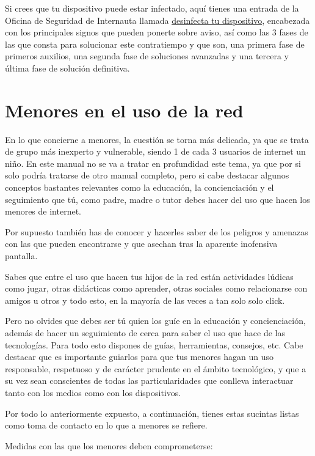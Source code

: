 \documentclass[
  a4paper,
  openany]{book}
\begin{document}
Si crees que tu dispositivo puede estar infectado, aquí tienes una entrada de la Oficina de Seguridad de Internauta llamada \href{https://www.osi.es/es/desinfecta-tu-ordenador}{desinfecta tu dispositivo}, encabezada con los principales signos que pueden ponerte sobre aviso, así como las 3 fases de las que consta para solucionar este contratiempo y que son, una primera fase de primeros auxilios, una segunda fase de soluciones avanzadas y una tercera y última fase de solución definitiva.

\hypertarget{menores-en-el-uso-de-la-red}{%
\section{Menores en el uso de la red}\label{menores-en-el-uso-de-la-red}}

En lo que concierne a menores, la cuestión se torna más delicada, ya que se trata de grupo más inexperto y vulnerable, siendo 1 de cada 3 usuarios de internet un niño. En este manual no se va a tratar en profundidad este tema, ya que por si solo podría tratarse de otro manual completo, pero si cabe destacar algunos conceptos bastantes relevantes como la educación, la concienciación y el seguimiento que tú, como padre, madre o tutor debes hacer del uso que hacen los menores de internet.

Por supuesto también has de conocer y hacerles saber de los peligros y amenazas con las que pueden encontrarse y que asechan tras la aparente inofensiva pantalla.

Sabes que entre el uso que hacen tus hijos de la red están actividades lúdicas como jugar, otras didácticas como aprender, otras sociales como relacionarse con amigos u otros y todo esto, en la mayoría de las veces a tan solo solo click.

Pero no olvides que debes ser tú quien los guíe en la educación y concienciación, además de hacer un seguimiento de cerca para saber el uso que hace de las tecnologías. Para todo esto dispones de guías, herramientas, consejos, etc. Cabe destacar que es importante guiarlos para que tus menores hagan un uso responsable, respetuoso y de carácter prudente en el ámbito tecnológico, y que a su vez sean conscientes de todas las particularidades que conlleva interactuar tanto con los medios como con los dispositivos.

Por todo lo anteriormente expuesto, a continuación, tienes estas sucintas listas como toma de contacto en lo que a menores se refiere.

Medidas con las que los menores deben comprometerse:
\end{document}
